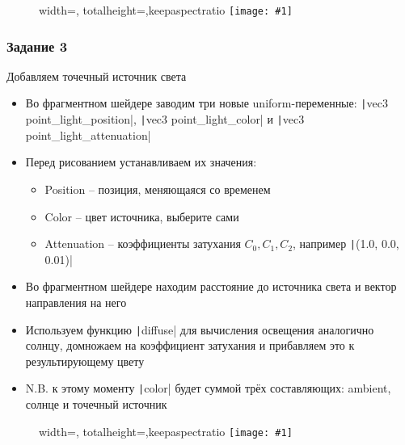 \documentclass[10pt]{beamer}
\newcommand{\slideimage}[1]{
  \begin{figure}
    \begin{adjustbox}{width=\textwidth, totalheight=\textheight-2\baselineskip-2\baselineskip,keepaspectratio}
      \texttt{[image: \#1]}
    \end{adjustbox}
  \end{figure}
}
\begin{document}
\begin{frame}[fragile]
\slideimage{2.png}
\end{frame}

\begin{frame}[fragile]
\frametitle{Задание 3}
Добавляем точечный источник света
\begin{itemize}
\item Во фрагментном шейдере заводим три новые uniform-переменные: \texttt|vec3 point_light_position|, \texttt|vec3 point_light_color| и \texttt|vec3 point_light_attenuation|
\item Перед рисованием устанавливаем их значения:
\begin{itemize}
\item Position -- позиция, меняющаяся со временем
\item Color -- цвет источника, выберите сами
\item Attenuation -- коэффициенты затухания \begin{math}C_0, C_1, C_2\end{math}, например \texttt|(1.0, 0.0, 0.01)|
\end{itemize}
\item Во фрагментном шейдере находим расстояние до источника света и вектор направления на него
\item Используем функцию \texttt|diffuse| для вычисления освещения аналогично солнцу, домножаем на коэффициент затухания и прибавляем это к результирующему цвету
\item N.B. к этому моменту \texttt|color| будет суммой трёх составляющих: ambient, солнце и точечный источник
\end{itemize}
\end{frame}

\begin{frame}[fragile]
\slideimage{3.png}
\end{frame}
\end{document}

